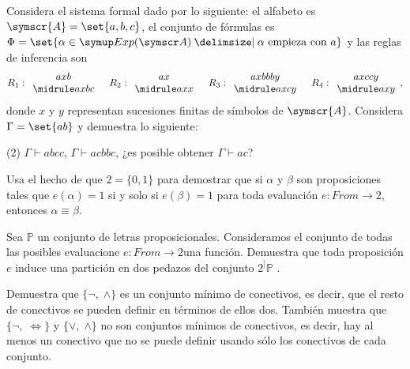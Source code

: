 \documentclass[fc]{tarea}
\newcommand{\al}{\symscr{A}}
\providecommand\st{}
\newcommand\SetSymbol[1][]{%
\nonscript\:#1\vert
\allowbreak
\nonscript\:
\mathopen{}}
\renewcommand\st{\SetSymbol[\delimsize]}
\begin{document}
\begin{exercise}
  Considera el sistema formal dado por lo siguiente: el alfabeto es
  \(\al=\set{a,b,c}\), el conjunto de fórmulas es 
  \(\Phi=\set{\alpha\in\expr\st\alpha\text{ empieza con } a}\) y las reglas de inferencia son
  \[
    R_1:
    \begin{array}{c}
      axb\\
      \midrule
      axbc
    \end{array}
    \quad
    R_2:
    \begin{array}{c}
      ax\\
      \midrule
      axx
    \end{array}
    \quad
    R_3:
    \begin{array}{c}
      axbbby\\
      \midrule
      axcy
    \end{array}
    \quad
    R_4:
    \begin{array}{c}
      axccy\\
      \midrule
      axy
    \end{array},
  \]
  donde \(x\) y \(y\) representan sucesiones finitas de símbolos de \(\al\). Considera \(\Gamma=\set{ab}\) y demuestra lo siguiente:
  \begin{tasks}(2)
    \task \(\Gamma\vdash abcc\),
    \task \(\Gamma\vdash acbbc\),
    \task ¿es posible obtener \(\Gamma\vdash ac\)?
  \end{tasks}
\end{exercise}

\begin{exercise}
  Usa el hecho de que \(2 = \{{0, 1}\}\) para demostrar que si \(\alpha\) y \(\beta\) son proposiciones tales que \(e(\alpha)=1\) si y solo si \(e(\beta)=1\) para toda evaluación \(e: From \to 2\), entonces \(\alpha\equiv \beta\).
\end{exercise}

\begin{exercise}
Sea \(\mathbb{P}\) un conjunto de letras proposicionales. Consideramos el conjunto de todas las posibles evaluacione \(e: From \to 2\)una función. Demuestra que toda proposición \(e\) induce una partición en dos pedazos del conjunto \(2^]{\mathbb{P}}\) .
\end{exercise}

\begin{exercise} Demuestra que \(\{\neg,\;\land\}\) es un conjunto mínimo de conectivos, es decir, que el resto de conectivos se pueden definir en términos de ellos dos. También muestra que \(\{\neg,\;\iff\}\) y \(\{\lor,\;\land\}\) no son conjuntos mínimos de conectivos, es decir, hay al menos un conectivo que no se puede definir usando sólo los conectivos de cada conjunto.
\end{exercise}
\end{document}
